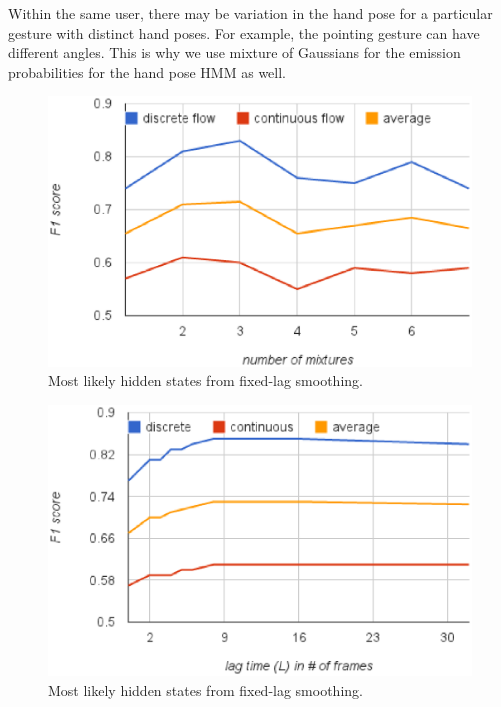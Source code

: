 \documentclass[conference]{IEEEtran}
\begin{document}
Within the same user, there may be variation in the hand pose for a particular
gesture with distinct hand poses. For example, the pointing gesture can have
different angles. This is why we use mixture of Gaussians for the emission
probabilities for the hand pose HMM as well. 

\begin{figure}[t]
\centering
\includegraphics[width=\columnwidth]{fig/f1_nM.ps}
\caption{Most likely hidden states from fixed-lag smoothing.}
\label{fig:mixtures}
\end{figure}

\begin{figure}[t]
\centering
\includegraphics[width=\columnwidth]{fig/f1_lag.ps}
\caption{Most likely hidden states from fixed-lag smoothing.}
\label{fig:lag}
\end{figure}

%
%
\end{document}
